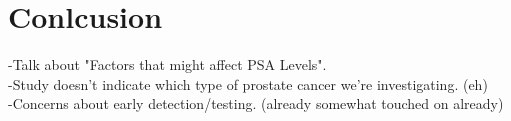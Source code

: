 %
%
%

\section{Conlcusion}

-Talk about "Factors that might affect PSA Levels". \\
-Study doesn't indicate which type of prostate cancer we're investigating. (eh) \\
-Concerns about early detection/testing. (already somewhat touched on already)
